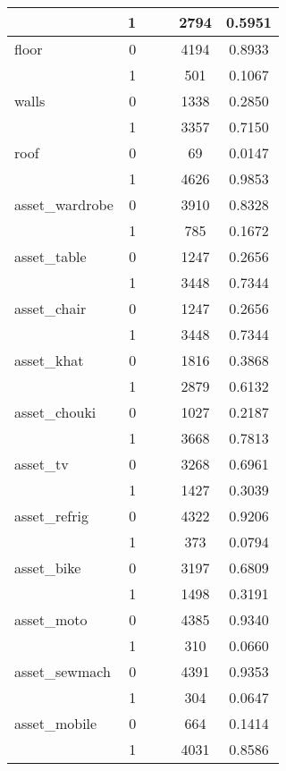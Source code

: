 \begin{table}[ht]
\begin{tabular}{|l|r|c|c||c|c|}
   & 1 &  &  &  2794 & 0.5951 \\ 
   \hline
floor & 0 &  &  &  4194 & 0.8933 \\ 
   & 1 &  &  &   501 & 0.1067 \\ 
   \hline
walls & 0 &  &  &  1338 & 0.2850 \\ 
   & 1 &  &  &  3357 & 0.7150 \\ 
   \hline
roof & 0 &  &  &    69 & 0.0147 \\ 
   & 1 &  &  &  4626 & 0.9853 \\ 
   \hline
asset\_wardrobe & 0 &  &  &  3910 & 0.8328 \\ 
   & 1 &  &  &   785 & 0.1672 \\ 
   \hline
asset\_table & 0 &  &  &  1247 & 0.2656 \\ 
   & 1 &  &  &  3448 & 0.7344 \\ 
   \hline
asset\_chair & 0 &  &  &  1247 & 0.2656 \\ 
   & 1 &  &  &  3448 & 0.7344 \\ 
   \hline
asset\_khat & 0 &  &  &  1816 & 0.3868 \\ 
   & 1 &  &  &  2879 & 0.6132 \\ 
   \hline
asset\_chouki & 0 &  &  &  1027 & 0.2187 \\ 
   & 1 &  &  &  3668 & 0.7813 \\ 
   \hline
asset\_tv & 0 &  &  &  3268 & 0.6961 \\ 
   & 1 &  &  &  1427 & 0.3039 \\ 
   \hline
asset\_refrig & 0 &  &  &  4322 & 0.9206 \\ 
   & 1 &  &  &   373 & 0.0794 \\ 
   \hline
asset\_bike & 0 &  &  &  3197 & 0.6809 \\ 
   & 1 &  &  &  1498 & 0.3191 \\ 
   \hline
asset\_moto & 0 &  &  &  4385 & 0.9340 \\ 
   & 1 &  &  &   310 & 0.0660 \\ 
   \hline
asset\_sewmach & 0 &  &  &  4391 & 0.9353 \\ 
   & 1 &  &  &   304 & 0.0647 \\ 
   \hline
asset\_mobile & 0 &  &  &   664 & 0.1414 \\ 
   & 1 &  &  &  4031 & 0.8586 \\ 
  \end{tabular}
\end{table}
